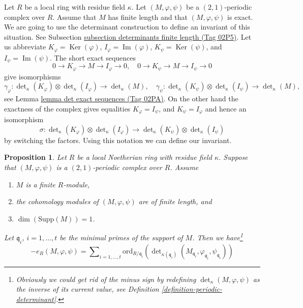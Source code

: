 \documentclass{amsart}
\theoremstyle{plain}
\newtheorem{proposition}[subsection]{Proposition}
\theoremstyle{definition}
\theoremstyle{remark}
\numberwithin{equation}{subsection}
\def\Ker{\mathop{\mathrm{Ker}}}
\def\Im{\mathop{\mathrm{Im}}}
\begin{document}
\noindent
Let $R$ be a local ring with residue field $\kappa$.
Let $(M, \varphi, \psi)$ be a $(2, 1)$-periodic complex over $R$.
Assume that $M$ has finite length and that $(M, \varphi, \psi)$ is
exact. We are going to use the determinant construction to define
an invariant of this situation. See
Subsection \href{https://stacks.math.columbia.edu/tag/02P5}{subsection determinants finite length (Tag 02P5)}.
Let us abbreviate
$K_\varphi = \Ker(\varphi)$,
$I_\varphi = \Im(\varphi)$,
$K_\psi = \Ker(\psi)$, and
$I_\psi = \Im(\psi)$.
The short exact sequences
$$
0 \to K_\varphi \to M \to I_\varphi \to 0, \quad
0 \to K_\psi \to M \to I_\psi \to 0
$$
give isomorphisms
$$
\gamma_\varphi :
\det\nolimits_\kappa(K_\varphi)
\otimes
\det\nolimits_\kappa(I_\varphi)
\longrightarrow
\det\nolimits_\kappa(M), \quad
\gamma_\psi :
\det\nolimits_\kappa(K_\psi)
\otimes
\det\nolimits_\kappa(I_\psi)
\longrightarrow
\det\nolimits_\kappa(M),
$$
see Lemma \href{https://stacks.math.columbia.edu/tag/02PA}{lemma det exact sequences (Tag 02PA)}.
On the other hand the exactness of the complex gives equalities
$K_\varphi = I_\psi$, and $K_\psi = I_\varphi$
and hence an isomorphism
$$
\sigma :
\det\nolimits_\kappa(K_\varphi)
\otimes
\det\nolimits_\kappa(I_\varphi)
\longrightarrow
\det\nolimits_\kappa(K_\psi)
\otimes
\det\nolimits_\kappa(I_\psi)
$$
by switching the factors. Using this notation we can define our invariant.


\begin{proposition}
\label{proposition-length-determinant-periodic-complex}
Let $R$ be a local Noetherian ring with residue field $\kappa$.
Suppose that $(M, \varphi, \psi)$ is a $(2, 1)$-periodic
complex over $R$. Assume
\begin{enumerate}
\item $M$ is a finite $R$-module,
\item the cohomology modules of $(M, \varphi, \psi)$ are of finite length, and
\item $\dim(\text{Supp}(M)) = 1$.
\end{enumerate}
Let $\mathfrak q_i$, $i = 1, \ldots, t$ be the minimal
primes of the support of $M$. Then we have\footnote{
Obviously we could get rid of the minus sign by redefining
$\det_\kappa(M, \varphi, \psi)$ as the inverse of its
current value, see Definition \ref{definition-periodic-determinant}.}
$$
- e_R(M, \varphi, \psi) =
\sum\nolimits_{i = 1, \ldots, t}
\text{ord}_{R/\mathfrak q_i}\left(
\det\nolimits_{\kappa(\mathfrak q_i)}
(M_{\mathfrak q_i}, \varphi_{\mathfrak q_i}, \psi_{\mathfrak q_i})
\right)
$$
\end{proposition}
\end{document}

